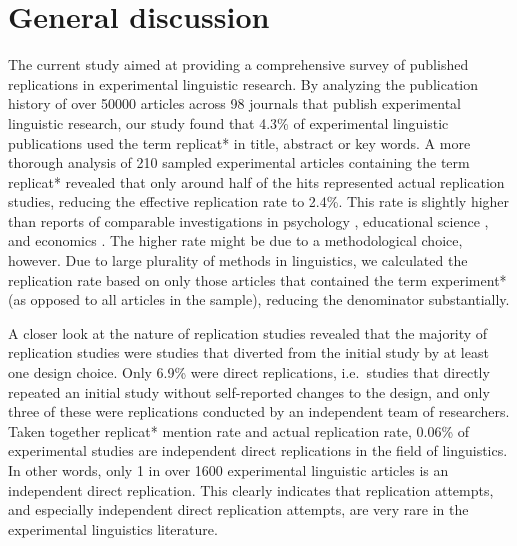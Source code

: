 \documentclass[cm,linguex]{glossa}
\begin{document}
\hypertarget{general-discussion}{%
\section{General discussion}\label{general-discussion}}

The current study aimed at providing a comprehensive survey of published replications in experimental linguistic research.
By analyzing the publication history of over 50000 articles across 98 journals that publish experimental linguistic research, our study found that 4.3\% of experimental linguistic publications used the term replicat* in title, abstract or key words.
A more thorough analysis of 210 sampled experimental articles containing the term replicat* revealed that only around half of the hits represented actual replication studies, reducing the effective replication rate to 2.4\%. This rate is slightly higher than reports of comparable investigations in psychology \citep[1.6\%,][]{makel_replications_2012}, educational science \citep[0.1\%,][]{makel_facts_2014}, and economics \citep[0.1\%,][]{mueller2019replication}. The higher rate might be due to a methodological choice, however. Due to large plurality of methods in linguistics, we calculated the replication rate based on only those articles that contained the term experiment* (as opposed to all articles in the sample), reducing the denominator substantially.

A closer look at the nature of replication studies revealed that the majority of replication studies were studies that diverted from the initial study by at least one design choice. Only 6.9\% were direct replications, i.e.~studies that directly repeated an initial study without self-reported changes to the design, and only three of these were replications conducted by an independent team of researchers.
Taken together replicat* mention rate and actual replication rate, 0.06\% of experimental studies are independent direct replications in the field of linguistics. In other words, only 1 in over 1600 experimental linguistic articles is an independent direct replication. This clearly indicates that replication attempts, and especially independent direct replication attempts, are very rare in the experimental linguistics literature.
\end{document}
